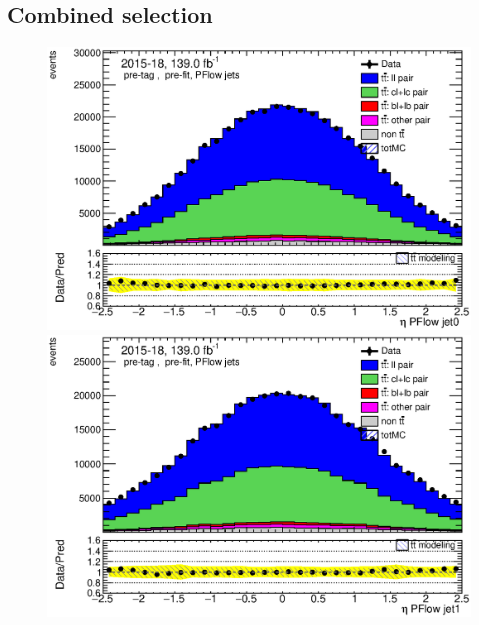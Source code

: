 \documentclass[letterpaper,12pt]{article}
\begin{document}
\subsection{Combined selection}
\begin{figure}[H]
	\begin{minipage}[b]{.45\textwidth}
	\centering
	\includegraphics[width=1\textwidth]{Oct_distributions/pretagNoRwDL1rwithhighpTPFlow_scaledall/DataMC_J0_eta.eps}
	\end{minipage}\hfill
	\begin{minipage}[b]{.45\textwidth}
	\centering
	\includegraphics[width=1\textwidth]{Oct_distributions/pretagNoRwDL1rwithhighpTPFlow_scaledall/DataMC_J1_eta.eps}
	\end{minipage}\hfill
	\begin{minipage}[b]{.45\textwidth}
	\centering

\end{minipage}
\end{figure}
\end{document}
